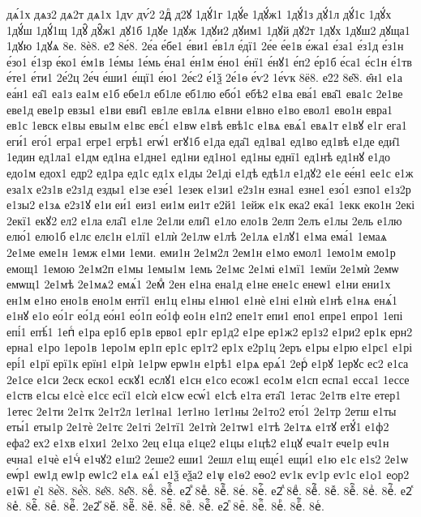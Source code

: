 {дѧ́1х
дѧз2
дѧ2т
дѧ1х
1дѵ
дѵ́2
2дⷧ
д2ꙋ
1дꙋ́1г
1дꙋ́е
1дꙋ́ж1
1дꙋ́1з
дꙋ́1л
дꙋ́1с
1дꙋ́х
1дꙋ́ш
1дꙋ́1щ
1дꙋ̑
дꙋ̑ж1
дꙋ1б
1дꙋе
1дꙋж
1дꙋи2
дꙋим1
1дꙋй
дꙋ2т
1дꙋх
1дꙋш2
дꙋща1
1дꙋю
1дꙋѧ
8е.
8ѐ8.
е2́
8е́8.
2е́а
е́бе1
е́ви1
е́в1л
е́дї1
2е́е
е́е1в
е́жа1
е́за1
е́з1д
е́з1н
е́зо1
е́1зр
е́ко1
е́м1в
1е́мы
1е́мь
е́на1
е́н1м
е́но1
е́нї1
е́нꙋ1
е́п2
е́р1б
е́са1
е́с1н
е́1тв
е́те1
е́ти1
2е́2ц
2е́ч
е́ши1
е́щї1
е́ю1
2е́є2
е́1ѯ
2е́1ѳ
е́ѵ2
1е́ѵк
8ё8.
е2̑2
8е̑8.
е̑н1
е1а
еа́н1
еа̑1
еа1з
еа1м
е1б
ебе1л
еб1ле
еб1лю
ебо́1
ебѣ2
е1ва
ева́1
ева̑1
ева1с
2е1ве
еве1д
еве1р
евзы1
е1ви
еви̑1
ев1ле
ев1лѧ
е1вни
е1вно
е1во
евол1
ево1н
евра1
ев1с
1евск
е1вы
евы1м
е1вє
евє́1
е1вѡ
е1вѣ
евѣ1с
е1вѧ
евѧ́1
евѧ1т
е1вꙋ
е1г
ега1
еги́1
его́1
егра1
егре1
егрѣ1
егѡ́1
егꙋ1б
е1да
еда̑1
ед1ва1
ед1во
ед1вѣ
е1де
еди̑1
1един
ед1ла1
е1дм
ед1на
е1дне1
ед1ни
ед1но1
ед1ны
еднї1
ед1нѣ
ед1нꙋ
е1до
едо1м
едох1
едр2
ед1ра
ед1с
ед1х
е1ды
2е1ді
е1дѣ
едѣ1л
е1дꙋ2
е1е
ее́н1
ее1с
е1ж
еза1х
е2з1в
е2з1д
езды1
е1зе
езе́1
1езек
е1зи1
е2з1н
езна1
езне1
езо́1
езпо1
е1з2р
е1зы2
е1зѧ
е2з1ꙋ
е1и
еи́1
еиз1
еи1м
еи1т
е2й1
1ейж
е1к
ека2
ека́1
1екк
еко1н
2екі
2екї1
екꙋ2
ел2
е1ла
ела̑1
е1ле
2е1ли
ели̑1
е1ло
ело1в
2елп
2елъ
е1лы
2ель
е1лю
елю́1
елю1б
е1лє
елє1н
е1лї1
е1лѝ
2е1лѡ
е1лѣ
2е1лѧ
е1лꙋ1
е1ма
ема́1
1емаѧ
2е1ме
еме1н
1емж
е1ми
1еми.
еми1н
2е1м2л
2ем1н
е1мо
емол1
1емо1м
емо1р
емощ1
1емою
2е1м2п
е1мы
1емы1м
1емь
2е1мє
2е1мі
е1мї1
1емїи
2е1мѝ
2емѡ
емѡщ1
2е1мѣ
2е1мѧ2
емѧ́1
2емⷣ
2ен
е1на
ена1д
е1не
ене1с
енеѡ1
е1ни
ени1х
ен1м
е1но
ено1в
ено1м
ентї1
ен1ц
е1ны
е1ню1
е1нѐ
е1ні
е1нѝ
е1нѣ
е1нѧ
енѧ́1
е1нꙋ
е1о
ео́1г
ео́1д
ео́н1
ео́1п
ео́1ф
ео1н
е1п2
епе1т
епи1
епо1
епре1
епро1
1епі
епі́1
епѣ́1
1епⷭ
е1ра
ер1б
ер1в
ерво1
ер1г
ер1д2
е1ре
ер1ж2
ер1з2
е1ри2
ер1к
ерн2
ерна1
е1ро
1еро1в
1еро1м
ер1п
ер1с
ер1т2
ер1х
е2р1ц
2еръ
е1ры
е1рю
е1рє1
е1рі
ері́1
е1рї
ерї1к
ерїн1
е1рѝ
1е1рѡ
ерѡ1н
е1рѣ1
е1рѧ
ерѧ́1
2ерⷭ
е1рꙋ
1ерꙋс
ес2
е1са
2е1се
е1си
2еск
еско1
ескꙋ1
еслꙋ1
е1сн
е1со
есож1
есо1м
е1сп
еспа1
есса1
1ессе
е1ств
е1сы
е1сѐ
е1сє
есї1
е1сѝ
е1сѡ
есѡ́1
е1сѣ
е1та
ета̑1
1етас
2е1тв
е1те
етер1
1етес
2е1ти
2е1тк
2е1т2л
1ет1на1
1ет1но
1ет1ны
2е1то2
ето́1
2е1тр
2етш
е1ты
еты́1
еты1р
2е1тѐ
2е1тє
2е1ті
2е1тї1
2е1тѝ
2е1тѡ1
е1тѣ
2е1тѧ
е1тꙋ
етꙋ́1
е1ф2
ефа2
ех2
е1хв
е1хи1
2е1хо
2ец
е1ца
е1це2
е1цы
е1цѣ2
е1цꙋ
еча1т
ече1р
еч1н
ечна1
е1чѐ
е1чⷭ
е1чꙋ2
е1ш2
2еше2
еши1
2ешл
е1щ
еще́1
ещи́1
е1ю
е1є
е1ѕ2
2е1ѡ
еѡ́р1
еѡ1д
еѡ1р
еѡ1с2
е1ѧ
еѧ́1
е1ѯ
еѯа2
е1ѱ
е1ѳ2
еѳо2
еѵ1к
еѵ1р
еѵ1с
е1ѻ1
еѻр2
е1ѿ1
е҆1
8е҆̀8.
8е҆́8.
8е҆̈8.
8е҆̑8.
8еⷠ.
8еⷠ҇.
е2ⷡ
8еⷡ.
8еⷡ҇.
8еⷢ.
8еⷢ҇.
е2ⷣ
8еⷣ.
8еⷣ҇.
8еⷤ.
8еⷤ҇.
8еⷥ.
8еⷥ҇.
е2ⷦ
8еⷦ.
8еⷦ҇.
8еⷧ.
8еⷧ҇.
2е2ⷨ
8еⷨ.
8еⷨ҇.
8еⷩ.
8еⷩ҇.
8еⷪ.
8еⷪ҇.
е2ⷫ
8еⷫ.
8еⷫ҇.
8еⷬ.
8еⷬ҇.
8еⷭ.
}
